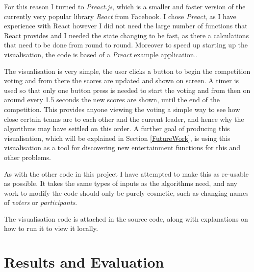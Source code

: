 \documentclass[12pt]{report}
\begin{document}
For this reason I turned to \textit{Preact.js}\cite{Preact}, which is a smaller and faster version of the currently very popular library \textit{React}\cite{React} from Facebook. I chose \textit{Preact}, as I have experience with React however I did not need the large number of functions that React provides and I needed the state changing to be fast, as there a calculations that need to be done from round to round. Moreover to speed up starting up the visualisation, the code is based of a \textit{Preact} example application.\cite{PreactBoilerplate}.

The visualisation is very simple, the user clicks a button to begin the competition voting and from there the scores are updated and shown on screen. A timer is used so that only one button press is needed to start the voting and from then on around every 1.5 seconds the new scores are shown, until the end of the competition. This provides anyone viewing the voting a simple way to see how close certain teams are to each other and the current leader, and hence why the algorithms may have settled on this order. A further goal of producing this visualisation, which will be explained in Section \ref{FutureWork}, is using this visualisation as a tool for discovering new entertainment functions for this and other problems. 

As with the other code in this project I have attempted to make this as re-usable as possible. It takes the same types of inputs as the algorithms need, and any work to modify the code should only be purely cosmetic, such as changing names of \textit{voters} or \textit{participants}.

The visualisation code is attached in the source code, along with explanations on how to run it to view it locally.

\section{Results and Evaluation}\label{Results}
\end{document}
